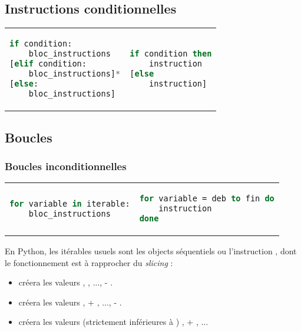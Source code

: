 \documentclass{hibiscus}
\begin{document}
\subsection{Instructions conditionnelles}

\begin{tabular}{p{} p{}}
\begin{lstlisting}[language=Python]
if condition:
    bloc_instructions
[elif condition:
    bloc_instructions]*
[else:
    bloc_instructions]
\end{lstlisting}
&
\begin{lstlisting}[language=Caml]
if condition then
    instruction
[else
    instruction]
\end{lstlisting}
\end{tabular}

\subsection{Boucles}

\subsubsection{Boucles inconditionnelles}

\begin{tabular}{p{} p{}}
\begin{lstlisting}[language=Python]
for variable in iterable:
    bloc_instructions
\end{lstlisting}
&
\begin{lstlisting}[language=Caml]
for variable = deb to fin do
    instruction
done
\end{lstlisting}
\end{tabular}

\par En Python, les itérables usuels sont les objects séquentiels ou l'instruction , dont le fonctionnement est à rapprocher du \textit{slicing} :
\begin{itemize}
\item {} créera les valeurs , , ...,  - .
\item {} créera les valeurs ,  + , ...,  - .
\item {} créera les valeurs (strictement inférieures à ) ,  + , ...
\end{itemize}
\end{document}
